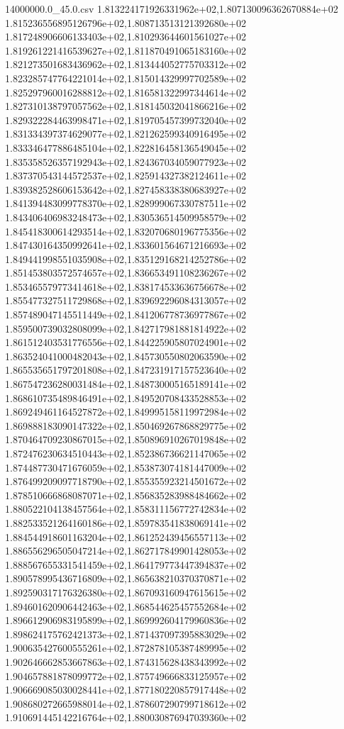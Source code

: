 \begin{filecontents*}{14000000.0_45.0.csv}
1.813224171926331962e+02,1.807130096362670884e+02
1.815236556895126796e+02,1.808713513121392680e+02
1.817248906606133403e+02,1.810293644601561027e+02
1.819261221416539627e+02,1.811870491065183160e+02
1.821273501683436962e+02,1.813444052775703312e+02
1.823285747764221014e+02,1.815014329997702589e+02
1.825297960016288812e+02,1.816581322997344614e+02
1.827310138797057562e+02,1.818145032041866216e+02
1.829322284463998471e+02,1.819705457399732040e+02
1.831334397374629077e+02,1.821262599340916495e+02
1.833346477886485104e+02,1.822816458136549045e+02
1.835358526357192943e+02,1.824367034059077923e+02
1.837370543144572537e+02,1.825914327382124611e+02
1.839382528606153642e+02,1.827458338380683927e+02
1.841394483099778370e+02,1.828999067330787511e+02
1.843406406983248473e+02,1.830536514509958579e+02
1.845418300614293514e+02,1.832070680196775356e+02
1.847430164350992641e+02,1.833601564671216693e+02
1.849441998551035908e+02,1.835129168214252786e+02
1.851453803572574657e+02,1.836653491108236267e+02
1.853465579773414618e+02,1.838174533636756678e+02
1.855477327511729868e+02,1.839692296084313057e+02
1.857489047145511449e+02,1.841206778736977867e+02
1.859500739032808099e+02,1.842717981881814922e+02
1.861512403531776556e+02,1.844225905807024901e+02
1.863524041000482043e+02,1.845730550802063590e+02
1.865535651797201808e+02,1.847231917157523640e+02
1.867547236280031484e+02,1.848730005165189141e+02
1.868610735489846491e+02,1.849520708433528853e+02
1.869249461164527872e+02,1.849995158119972984e+02
1.869888183090147322e+02,1.850469267868829775e+02
1.870464709230867015e+02,1.850896910267019848e+02
1.872476230634510443e+02,1.852386736621147065e+02
1.874487730471676059e+02,1.853873074181447009e+02
1.876499209097718790e+02,1.855355923214501672e+02
1.878510666868087071e+02,1.856835283988484662e+02
1.880522104138457564e+02,1.858311156772742834e+02
1.882533521264160186e+02,1.859783541838069141e+02
1.884544918601163204e+02,1.861252439456557113e+02
1.886556296505047214e+02,1.862717849901428053e+02
1.888567655331541459e+02,1.864179773447394837e+02
1.890578995436716809e+02,1.865638210370370871e+02
1.892590317176326380e+02,1.867093160947615615e+02
1.894601620906442463e+02,1.868544625457552684e+02
1.896612906983195899e+02,1.869992604179960836e+02
1.898624175762421373e+02,1.871437097395883029e+02
1.900635427600555261e+02,1.872878105387489995e+02
1.902646662853667863e+02,1.874315628438343992e+02
1.904657881878099772e+02,1.875749666833125957e+02
1.906669085030028441e+02,1.877180220857917448e+02
1.908680272665988014e+02,1.878607290799718612e+02
1.910691445142216764e+02,1.880030876947039360e+02

\end{filecontents*}

